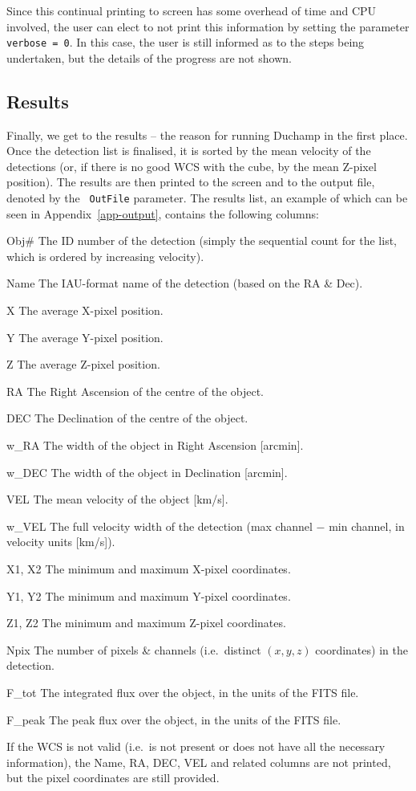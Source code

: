 \documentclass[12pt,a4paper]{article}
\newcommand{\ie}{i.e.\ }
\newcommand{\entrylabel}[1]{\mbox{\textsf{\bf{#1:}}}\hfil}
\newenvironment{entry}
        {\begin{list}{}%
                {\renewcommand{\makelabel}{\entrylabel}%
                        \setlength{\labelwidth}{30mm}%
                        \setlength{\labelsep}{5pt}%
                        \setlength{\itemsep}{2pt}%
                        \setlength{\parsep}{2pt}%
                        \setlength{\leftmargin}{35mm}%
                }%
        }%
{\end{list}}
\begin{document}
Since this continual printing to screen has some overhead of time and
CPU involved, the user can elect to not print this information by
setting the parameter {\tt verbose = 0}. In this case, the user is
still informed as to the steps being undertaken, but the details of
the progress are not shown.

\subsection{Results}

Finally, we get to the results -- the reason for running Duchamp in
the first place. Once the detection list is finalised, it is sorted by
the mean velocity of the detections (or, if there is no good WCS with
the cube, by the mean Z-pixel position). The results are then
printed to the screen and to the output file, denoted by the {\tt
OutFile} parameter. The results list, an example of which can be seen
in Appendix~\ref{app-output}, contains the following columns:

\begin{entry}
\item[Obj\#] The ID number of the detection (simply the sequential
  count for the list, which is ordered by increasing velocity).
\item[Name] The IAU-format name of the detection (based on the RA \&
Dec).
\item[X] The average X-pixel position.
\item[Y] The average Y-pixel position.
\item[Z] The average Z-pixel position.
\item[RA] The Right Ascension of the centre of the object.
\item[DEC] The Declination of the centre of the object.
\item[w\_RA] The width of the object in Right Ascension [arcmin].
\item[w\_DEC] The width of the object in Declination [arcmin].
\item[VEL] The mean velocity of the object [km/s].
\item[w\_VEL] The full velocity width of the detection (max channel
  $-$ min channel, in velocity units [km/s]).
\item[X1, X2] The minimum and maximum X-pixel coordinates.
\item[Y1, Y2] The minimum and maximum Y-pixel coordinates.
\item[Z1, Z2] The minimum and maximum Z-pixel coordinates.
\item[Npix] The number of pixels \& channels (\ie distinct $(x,y,z)$
  coordinates) in the detection.
\item[F\_tot] The integrated flux over the object, in the units of the
  FITS file. %
\item[F\_peak] The peak flux over the object, in the units of the FITS
  file.
\end{entry}
If the WCS is not valid (\ie is not present or does not have all the
necessary information), the Name, RA, DEC, VEL and related columns are not
printed, but the pixel coordinates are still provided.
\end{document}
